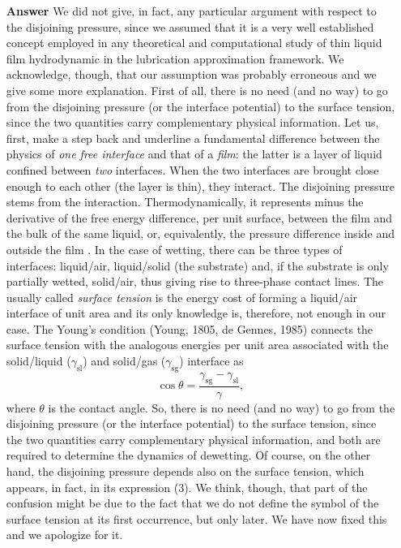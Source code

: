 \documentclass[12pt,english]{article}
\begin{document}
\begin{itemize}
\item[ \textbf{{Answer}}]
{
We did not give, in fact, any particular argument with respect to the disjoining pressure, since 
we assumed that it is a very well established concept employed in any theoretical and computational study of thin liquid film hydrodynamic in the lubrication approximation framework.
We acknowledge, though, that our assumption was probably erroneous and we give some more explanation. 
First of all, there is no need (and no way) to go from the disjoining pressure (or the interface potential) to the surface tension, since the two quantities carry complementary physical information. 
Let us, first, make a step back and underline a fundamental difference between the physics of {\it one free interface} and that of a {\it film}:
the latter is a layer of liquid confined between {\it two} interfaces. When the two interfaces are brought close enough to each other (the layer is thin), they interact.
The disjoining pressure stems from the interaction. Thermodynamically, it represents minus the derivative of the free energy difference, per unit surface, between 
the film and the bulk of the same liquid, or, equivalently, the pressure difference inside and outside the film 
\cite{Deryaguin1936,DeryaguinChuraev1978}.
In the case of wetting, there can be three types of interfaces: liquid/air, liquid/solid (the substrate) and, 
if the substrate is only partially wetted, solid/air, thus giving rise to three-phase contact lines. 
The usually called {\it surface tension} is the energy cost of forming a liquid/air interface of unit area and its only knowledge is, therefore, not enough in our case. 
The Young's condition (Young, 1805, de Gennes, 1985) connects the surface tension with the analogous energies per unit
area associated with the solid/liquid ($\gamma_{\text{sl}}$) and solid/gas ($\gamma_{\text{sg}}$) interface as
\begin{equation}
\cos \theta = \frac{\gamma_{\text{sg}}-\gamma_{\text{sl}}}{\gamma},
\end{equation}
where $\theta$ is the contact angle.
So, there is no need (and no way) to go from the disjoining pressure (or the interface potential) to the surface tension, since the two quantities carry complementary physical information,
and both are required to determine the dynamics of dewetting.
Of course, on the other hand, the disjoining pressure depends also on the surface tension, which appears, in fact, in its expression (3). 
We think, though, that part of the confusion might be due to the fact that we do not define the symbol of the surface tension at its first occurrence, but only later. 
We have now fixed this and we apologize for it.
}


\end{itemize}
\end{document}
